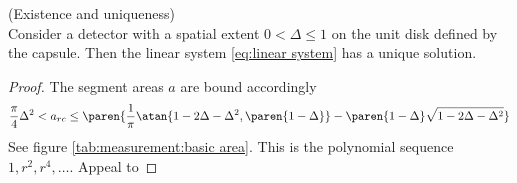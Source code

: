 \begin{Theorem}(Existence and uniqueness) \\
Consider a detector with a spatial extent $0 < \Delta \le 1$ on the unit disk defined by the capsule. Then the linear system \eqref{eq:linear system} has a unique solution.
\label{thm:psi solution}
\end{Theorem}
\begin{proof}
The segment areas $a$ are bound accordingly
\begin{equation}
  \frac{\pi}{4}\Delta^{2} < a_{rc} \le \paren{\frac{1}{\pi} \atan{1-2\Delta-\Delta^{2}, \paren{1-\Delta}} - \paren{1-\Delta} \sqrt{1-2\Delta-\Delta^{2}} }
\end{equation}
See figure \eqref{tab:measurement:basic area}.
This is the polynomial sequence $1,r^{2},r^{4},\dots$.
Appeal to \ms
\end{proof}

\endinput %